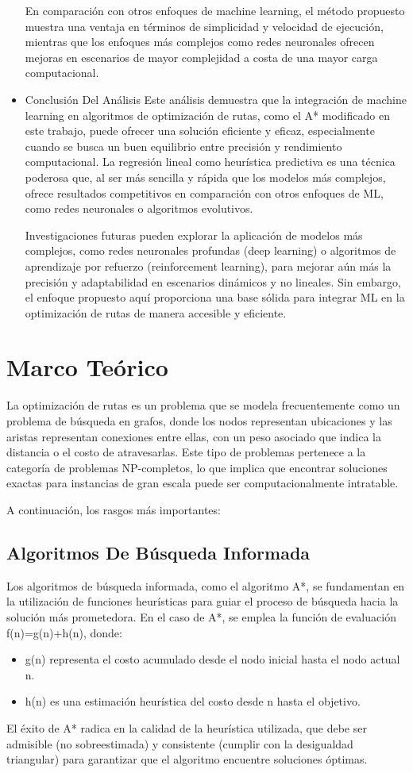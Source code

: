 \documentclass[conference]{IEEEtran}
\begin{document}
\begin{itemize}
	En comparación con otros enfoques de machine learning, el método propuesto muestra una ventaja en términos de simplicidad y velocidad de ejecución, mientras que los enfoques más complejos como redes neuronales ofrecen mejoras en escenarios de mayor complejidad a costa de una mayor carga computacional.
	
	\item Conclusión Del Análisis
	Este análisis demuestra que la integración de machine learning en algoritmos de optimización de rutas, como el A* modificado en este trabajo, puede ofrecer una solución eficiente y eficaz, especialmente cuando se busca un buen equilibrio entre precisión y rendimiento computacional. La regresión lineal como heurística predictiva es una técnica poderosa que, al ser más sencilla y rápida que los modelos más complejos, ofrece resultados competitivos en comparación con otros enfoques de ML, como redes neuronales o algoritmos evolutivos.

	Investigaciones futuras pueden explorar la aplicación de modelos más complejos, como redes neuronales profundas (deep learning) o algoritmos de aprendizaje por refuerzo (reinforcement learning), para mejorar aún más la precisión y adaptabilidad en escenarios dinámicos y no lineales. Sin embargo, el enfoque propuesto aquí proporciona una base sólida para integrar ML en la optimización de rutas de manera accesible y eficiente.
	\end{itemize}
	\section{Marco Teórico}
	La optimización de rutas es un problema que se modela frecuentemente como un problema de búsqueda en grafos, donde los nodos representan ubicaciones y las aristas representan conexiones entre ellas, con un peso asociado que indica la distancia o el costo de atravesarlas. Este tipo de problemas pertenece a la categoría de problemas NP-completos, lo que implica que encontrar soluciones exactas para instancias de gran escala puede ser computacionalmente intratable.
	
	A continuación, los rasgos más importantes:
	\subsection{Algoritmos De Búsqueda Informada}
	Los algoritmos de búsqueda informada, como el algoritmo A*, se fundamentan en la utilización de funciones heurísticas para guiar el proceso de búsqueda hacia la solución más prometedora. En el caso de A*, se emplea la función de evaluación f(n)=g(n)+h(n), donde:
	\begin{itemize}
		\item g(n) representa el costo acumulado desde el nodo inicial hasta el nodo actual n.
		\item h(n) es una estimación heurística del costo desde n hasta el objetivo.
	\end{itemize}
	El éxito de A* radica en la calidad de la heurística utilizada, que debe ser admisible (no sobreestimada) y consistente (cumplir con la desigualdad triangular) para garantizar que el algoritmo encuentre soluciones óptimas.
\end{document}
